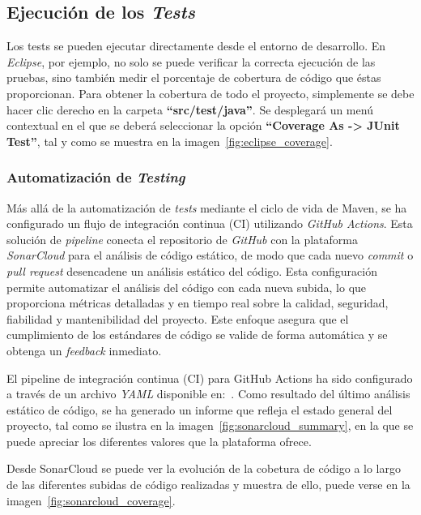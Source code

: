 \subsection{Ejecución de los \emph{Tests}}
Los tests se pueden ejecutar directamente desde el entorno de desarrollo. En \textit{Eclipse}, por ejemplo, no solo se puede verificar la correcta ejecución de las pruebas, sino también medir el porcentaje de cobertura de código que éstas proporcionan. Para obtener la cobertura de todo el proyecto, simplemente se debe hacer clic derecho en la carpeta \textbf{``src/test/java''}. Se desplegará un menú contextual en el que se deberá seleccionar la opción \textbf{``Coverage As -> JUnit Test''}, tal y como se muestra en la imagen~\ref{fig:eclipse_coverage}.


\subsubsection{Automatización de \emph{Testing}}
Más allá de la automatización de \emph{tests} mediante el ciclo de vida de Maven, se ha configurado un flujo de integración continua (CI) utilizando \textit{GitHub Actions}. Esta solución de \emph{pipeline} conecta el repositorio de \textit{GitHub} con la plataforma \textit{SonarCloud} para el análisis de código estático, de modo que cada nuevo \emph{commit} o \emph{pull request} desencadene un análisis estático del código. Esta configuración permite automatizar el análisis del código con cada nueva subida, lo que proporciona métricas detalladas y en tiempo real sobre la calidad, seguridad, fiabilidad y mantenibilidad del proyecto. Este enfoque asegura que el cumplimiento de los estándares de código se valide de forma automática y se obtenga un \emph{feedback} inmediato.

El pipeline de integración continua (CI) para GitHub Actions ha sido configurado a través de un archivo \textit{YAML} disponible en:~\cite{github_action_ci}. Como resultado del último análisis estático de código, se ha generado un informe que refleja el estado general del proyecto, tal como se ilustra en la imagen~\ref{fig:sonarcloud_summary}, en la que se puede apreciar los diferentes valores que la plataforma ofrece.


Desde SonarCloud se puede ver la evolución de la cobetura de código a lo largo de las diferentes subidas de código realizadas y muestra de ello, puede verse en la imagen~\ref{fig:sonarcloud_coverage}.

